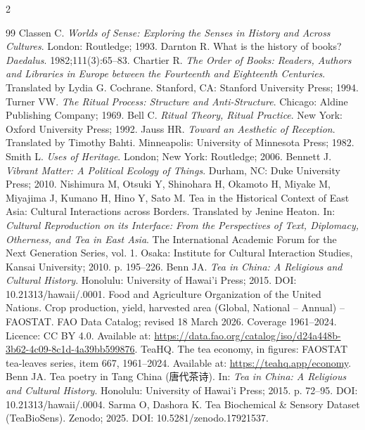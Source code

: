 \documentclass[numbers]{IntechOpen-Book}
\newcommand{\zh}[1]{{\CJKfontspec{Noto Serif CJK SC}\upshape #1}}
\begin{document}
\begin{backmatter}
\begin{multicols}{2}
\begin{thebibliography}{99}
 Classen C. \textit{Worlds of Sense: Exploring the Senses in History and Across Cultures}. London: Routledge; 1993.
 Darnton R. What is the history of books? \textit{Daedalus}. 1982;111(3):65--83.
 Chartier R. \textit{The Order of Books: Readers, Authors and Libraries in Europe between the Fourteenth and Eighteenth Centuries}. Translated by Lydia G. Cochrane. Stanford, CA: Stanford University Press; 1994.
 Turner VW. \textit{The Ritual Process: Structure and Anti-Structure}. Chicago: Aldine Publishing Company; 1969.
 Bell C. \textit{Ritual Theory, Ritual Practice}. New York: Oxford University Press; 1992.
 Jauss HR. \textit{Toward an Aesthetic of Reception}. Translated by Timothy Bahti. Minneapolis: University of Minnesota Press; 1982.
 Smith L. \textit{Uses of Heritage}. London; New York: Routledge; 2006.
 Bennett J. \textit{Vibrant Matter: A Political Ecology of Things}. Durham, NC: Duke University Press; 2010.
 Nishimura M, Otsuki Y, Shinohara H, Okamoto H, Miyake M, Miyajima J, Kumano H, Hino Y, Sato M. Tea in the Historical Context of East Asia: Cultural Interactions across Borders. Translated by Jenine Heaton. In: \textit{Cultural Reproduction on its Interface: From the Perspectives of Text, Diplomacy, Otherness, and Tea in East Asia}. The International Academic Forum for the Next Generation Series, vol. 1. Osaka: Institute for Cultural Interaction Studies, Kansai University; 2010. p. 195--226.
 Benn JA. \textit{Tea in China: A Religious and Cultural History}. Honolulu: University of Hawai'i Press; 2015. DOI: 10.21313/hawaii/.0001.
 Food and Agriculture Organization of the United Nations. Crop production, yield, harvested area (Global, National -- Annual) -- FAOSTAT. FAO Data Catalog; revised 18 March 2026. Coverage 1961--2024. Licence: CC BY 4.0. Available at: \url{https://data.fao.org/catalog/iso/d24a448b-3b62-4c09-8c1d-4a39bb599876}.
 TeaHQ. The tea economy, in figures: FAOSTAT tea-leaves series, item 667, 1961--2024. Available at: \url{https://teahq.app/economy}.
 Benn JA. Tea poetry in Tang China (\zh{唐代茶诗}). In: \textit{Tea in China: A Religious and Cultural History}. Honolulu: University of Hawai'i Press; 2015. p. 72--95. DOI: 10.21313/hawaii/.0004.
 Sarma O, Dashora K. Tea Biochemical \& Sensory Dataset (TeaBioSens). Zenodo; 2025. DOI: 10.5281/zenodo.17921537.

\end{thebibliography}
\end{multicols}
\end{backmatter}
\end{document}
